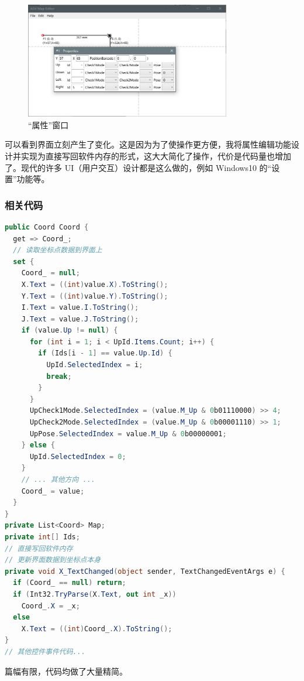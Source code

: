 \begin{figure}[H]
  \centering
  \includegraphics[width=0.8\textwidth]{assets/prop2.png}
  \caption{``属性''窗口}
  \label{fig:prop2}
\end{figure}

可以看到界面立刻产生了变化。这是因为为了使操作更方便，我将属性编辑功能设计并实现为直接写回软件内存的形式，这大大简化了操作，代价是代码量也增加了。现代的许多 UI（用户交互）设计都是这么做的，例如 Windows10 的``设置''功能等。

\subsubsection{相关代码}

\begin{lstlisting}[language=cs]
public Coord Coord {
  get => Coord_;
  // 读取坐标点数据到界面上
  set {
    Coord_ = null;
    X.Text = ((int)value.X).ToString();
    Y.Text = ((int)value.Y).ToString();
    I.Text = value.I.ToString();
    J.Text = value.J.ToString();
    if (value.Up != null) {
      for (int i = 1; i < UpId.Items.Count; i++) {
        if (Ids[i - 1] == value.Up.Id) {
          UpId.SelectedIndex = i;
          break;
        }
      }
      UpCheck1Mode.SelectedIndex = (value.M_Up & 0b01110000) >> 4;
      UpCheck2Mode.SelectedIndex = (value.M_Up & 0b00001110) >> 1;
      UpPose.SelectedIndex = value.M_Up & 0b00000001;
    } else {
      UpId.SelectedIndex = 0;
    }
    // ... 其他方向 ...
    Coord_ = value;
  }
}
private List<Coord> Map;
private int[] Ids;
// 直接写回软件内存
// 更新界面数据到坐标点本身
private void X_TextChanged(object sender, TextChangedEventArgs e) {
  if (Coord_ == null) return;
  if (Int32.TryParse(X.Text, out int _x))
    Coord_.X = _x;
  else
    X.Text = ((int)Coord_.X).ToString();
}
// 其他控件事件代码...
\end{lstlisting}

篇幅有限，代码均做了大量精简。

